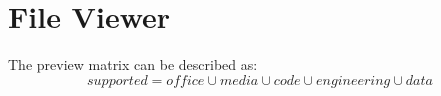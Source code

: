 \documentclass{article}
\begin{document}
\section{File Viewer}
The preview matrix can be described as:
\[
  supported = office \cup media \cup code \cup engineering \cup data
\]
\end{document}
